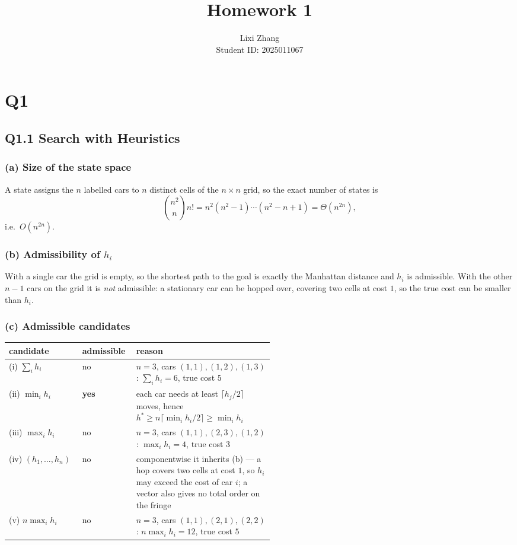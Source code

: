 \documentclass[11pt]{article}
\title{Homework 1}
\author{Lixi Zhang\\ Student ID: 2025011067}
\begin{document}
\maketitle

\section*{Q1}

\subsection*{Q1.1 Search with Heuristics}

\subsubsection*{(a) Size of the state space}
A state assigns the $n$ labelled cars to $n$ distinct cells of the $n\times n$
grid, so the exact number of states is
\[
    \binom{n^{2}}{n} n! = n^{2}(n^{2}-1)\cdots(n^{2}-n+1) = \Theta(n^{2n}),
\]
i.e.\ $O(n^{2n})$.

\subsubsection*{(b) Admissibility of $h_i$}
With a single car the grid is empty, so the shortest path to the goal is exactly
the Manhattan distance and $h_i$ is admissible. With the other
$n-1$ cars on the grid it is \emph{not} admissible: a stationary car can be
hopped over, covering two cells at cost $1$, so the true cost can be smaller
than $h_i$.
\subsubsection*{(c) Admissible candidates}

\begin{center}
\begin{tabular}{@{}llp{0.52\linewidth}@{}}
    \toprule
    candidate & admissible & reason \\
    \midrule
    (i) $\sum_i h_i$       & no  & $n=3$, cars $(1,1),(1,2),(1,3)$: $\sum_i h_i = 6$, true cost $5$ \\
    (ii) $\min_i h_i$      & \textbf{yes} & each car needs at least $\lceil h_j/2\rceil$ moves,
                                            hence $h^{*}\ge n\lceil \min_i h_i/2\rceil \ge \min_i h_i$ \\
    (iii) $\max_i h_i$     & no  & $n=3$, cars $(1,1),(2,3),(1,2)$: $\max_i h_i = 4$, true cost $3$ \\
    (iv) $(h_1,\dots,h_n)$ & no  & componentwise it inherits (b) --- a hop covers two cells at cost
                                   $1$, so $h_i$ may exceed the cost of car $i$; a vector also gives no
                                   total order on the fringe \\
    (v) $n\max_i h_i$      & no  & $n=3$, cars $(1,1),(2,1),(2,2)$: $n\max_i h_i = 12$, true cost $5$ \\
    \bottomrule
\end{tabular}
\end{center}
\end{document}
